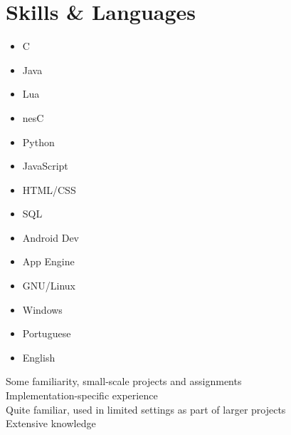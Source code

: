 \documentclass[a4paper,10pt]{article}
\begin{document}
\section{Skills \& Languages}
\begin{multicols}{3}
  \begin{itemize}
    \renewcommand{\labelitemi}{\textcolor{lightg}{\symbol{"00BB}}}
    \setlength{\itemsep}{1pt}
    \setlength{\parskip}{0pt}
    \setlength{\parsep}{0pt}
  \item C \hfill \threenotes 
  \item Java \hfill \threenotes
  \item Lua \hfill \twonotes
  \item nesC \hfill \twonotes
  \item Python \hfill \twonotes
  \item JavaScript \hfill \twonotes
  \item HTML/CSS \hfill \threenotes
  \item SQL \hfill \twonotes
  \item Android Dev \hfill \twonotes
  \item App Engine \hfill \twonotes
  \item GNU/Linux \hfill \threenotes
  \item Windows \hfill \threenotes
  \item Portuguese \hfill \fournotes
  \item English \hfill \threenotes
  \end{itemize} 
\end{multicols}

\vspace{1em}

\begin{center}
  \parbox{12cm}{
    \onenote Some familiarity, small-scale projects and assignments \\
    \twonotes Implementation-specific experience \\
    \threenotes Quite familiar, used in limited settings as part of larger projects \\
    \fournotes Extensive knowledge
  }
\end{center}
\end{document}
